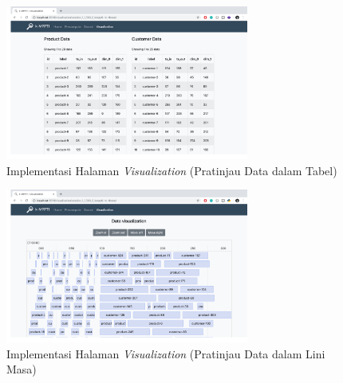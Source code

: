 \begin{figure}[H]
	\centering
	\includegraphics[width=8cm]{assets/img/bab4/visual-table.png}
	\caption{Implementasi Halaman \textit{Visualization} (Pratinjau Data dalam Tabel)}
	\label{fig:visual-table}
\end{figure}

\begin{figure}[H]
	\centering
	\includegraphics[width=8cm]{assets/img/bab4/visual-timeline.png}
	\caption{Implementasi Halaman \textit{Visualization} (Pratinjau Data dalam Lini Masa)}
	\label{fig:visual-timeline}
\end{figure}